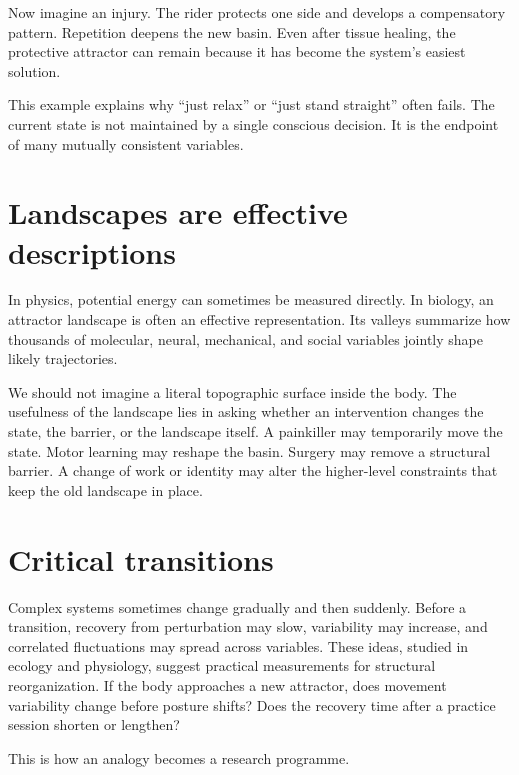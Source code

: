Now imagine an injury. The rider protects one side and develops a compensatory pattern. Repetition deepens the new basin. Even after tissue healing, the protective attractor can remain because it has become the system's easiest solution.

This example explains why ``just relax'' or ``just stand straight'' often fails. The current state is not maintained by a single conscious decision. It is the endpoint of many mutually consistent variables.

\section{Landscapes are effective descriptions}\label{landscapes-are-effective-descriptions}

In physics, potential energy can sometimes be measured directly. In biology, an attractor landscape is often an effective representation. Its valleys summarize how thousands of molecular, neural, mechanical, and social variables jointly shape likely trajectories.

We should not imagine a literal topographic surface inside the body. The usefulness of the landscape lies in asking whether an intervention changes the state, the barrier, or the landscape itself. A painkiller may temporarily move the state. Motor learning may reshape the basin. Surgery may remove a structural barrier. A change of work or identity may alter the higher-level constraints that keep the old landscape in place.

\section{Critical transitions}\label{critical-transitions}

Complex systems sometimes change gradually and then suddenly. Before a transition, recovery from perturbation may slow, variability may increase, and correlated fluctuations may spread across variables. These ideas, studied in ecology and physiology, suggest practical measurements for structural reorganization. If the body approaches a new attractor, does movement variability change before posture shifts? Does the recovery time after a practice session shorten or lengthen?

This is how an analogy becomes a research programme.
